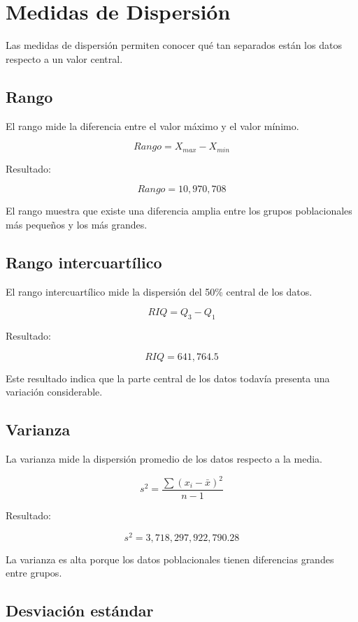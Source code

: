 \documentclass[12pt]{article}
\begin{document}
\section{Medidas de Dispersión}

Las medidas de dispersión permiten conocer qué tan separados están los datos respecto a un valor central.

\subsection{Rango}

El rango mide la diferencia entre el valor máximo y el valor mínimo.

\[
Rango=X_{max}-X_{min}
\]

Resultado:

\[
Rango=10,970,708
\]

El rango muestra que existe una diferencia amplia entre los grupos poblacionales más pequeños y los más grandes.

\subsection{Rango intercuartílico}

El rango intercuartílico mide la dispersión del 50\% central de los datos.

\[
RIQ=Q_3-Q_1
\]

Resultado:

\[
RIQ=641,764.5
\]

Este resultado indica que la parte central de los datos todavía presenta una variación considerable.

\subsection{Varianza}

La varianza mide la dispersión promedio de los datos respecto a la media.

\[
s^2=\frac{\sum (x_i-\bar{x})^2}{n-1}
\]

Resultado:

\[
s^2=3,718,297,922,790.28
\]

La varianza es alta porque los datos poblacionales tienen diferencias grandes entre grupos.

\subsection{Desviación estándar}
\end{document}
